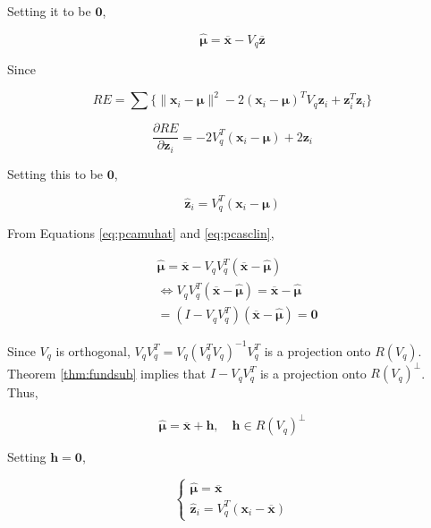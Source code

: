 \documentclass[]{book}
\theoremstyle{definition}
\theoremstyle{definition}
\theoremstyle{definition}
\theoremstyle{remark}
\begin{document}
Setting it to be \(\mathbf{0}\),

\begin{equation}
  \hat{\boldsymbol\mu} = \overline{\mathbf{x}} - V_q \overline{\mathbf{z}}
  \label{eq:pcamuhat}
\end{equation}

Since

\[RE = \sum \Big\{ \lVert \mathbf{x}_i - \boldsymbol\mu \rVert^2 - 2(\mathbf{x}_i - \boldsymbol\mu)^T V_q \mathbf{z}_i + \mathbf{z}_i^T \mathbf{z}_i \Big\}\]

\[\frac{\partial RE}{\partial \mathbf{z}_i} = -2 V_q^T (\mathbf{x}_i - \boldsymbol\mu) + 2 \mathbf{z}_i\]

Setting this to be \(\mathbf{0}\),

\begin{equation}
  \hat{\mathbf{z}}_i = V_q^T (\mathbf{x}_i - \boldsymbol\mu)
  \label{eq:pcasclin}
\end{equation}

From Equations \eqref{eq:pcamuhat} and \eqref{eq:pcasclin},

\begin{equation*}
  \begin{split}
    & \hat{\boldsymbol\mu} = \overline{\mathbf{x}} - V_q V_q^T (\overline{\mathbf{x}} - \hat{\boldsymbol\mu}) \\
    & \Leftrightarrow V_q V_q^T (\overline{\mathbf{x}} - \hat{\boldsymbol\mu}) = \overline{\mathbf{x}} - \hat{\boldsymbol\mu} \\
    & = (I - V_q V_q^T) (\overline{\mathbf{x}} - \hat{\boldsymbol\mu}) = \mathbf{0}
  \end{split}
\end{equation*}

Since \(V_q\) is orthogonal, \(V_q V_q^T = V_q (V_q^T V_q)^{-1} V_q^T\) is a projection onto \(R(V_q)\). Theorem \ref{thm:fundsub} implies that \(I - V_q V_q^T\) is a projection onto \(R(V_q)^{\perp}\). Thus,

\[\hat{\boldsymbol\mu} = \overline{\mathbf{x}} + \mathbf{h}, \quad \mathbf{h} \in R(V_q)^{\perp}\]

Setting \(\mathbf{h} = \mathbf{0}\),

\begin{equation}
  \begin{cases}
    \hat{\boldsymbol\mu} = \overline{\mathbf{x}} \\
    \hat{\mathbf{z}}_i = V_q^T (\mathbf{x}_i - \overline{\mathbf{x}})
  \end{cases}
  \label{eq:pcamuaz}
\end{equation}
\end{document}
